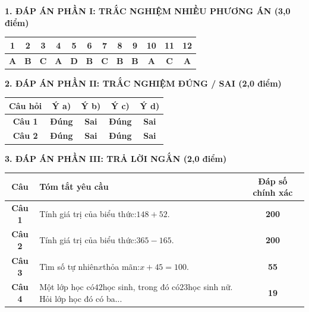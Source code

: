 \documentclass[11pt,a4paper]{article}
\begin{document}
\vspace{10pt}
\noindent\textbf{\large 1. ĐÁP ÁN PHẦN I: TRẮC NGHIỆM NHIỀU PHƯƠNG ÁN (3,0 điểm)}
\vspace{4pt}
\begin{center}
\begin{tabular}{|c|c|c|c|c|c|c|c|c|c|c|c|}
\hline
\textbf{1} & \textbf{2} & \textbf{3} & \textbf{4} & \textbf{5} & \textbf{6} & \textbf{7} & \textbf{8} & \textbf{9} & \textbf{10} & \textbf{11} & \textbf{12} \\
\hline
\textbf{A} & \textbf{B} & \textbf{C} & \textbf{A} & \textbf{D} & \textbf{B} & \textbf{C} & \textbf{B} & \textbf{B} & \textbf{A} & \textbf{C} & \textbf{A} \\
\hline
\end{tabular}
\end{center}
\vspace{6pt}


\noindent\textbf{\large 2. ĐÁP ÁN PHẦN II: TRẮC NGHIỆM ĐÚNG / SAI (2,0 điểm)}
\vspace{4pt}
\begin{center}
\begin{tabular}{|c|c|c|c|c|}
\hline
\textbf{Câu hỏi} & \textbf{Ý a)} & \textbf{Ý b)} & \textbf{Ý c)} & \textbf{Ý d)} \\
\hline
\textbf{Câu 1} & \textbf{Đúng} & \textbf{Sai} & \textbf{Đúng} & \textbf{Sai} \\
\hline
\textbf{Câu 2} & \textbf{Đúng} & \textbf{Sai} & \textbf{Đúng} & \textbf{Sai} \\
\hline
\end{tabular}
\end{center}
\vspace{6pt}


\noindent\textbf{\large 3. ĐÁP ÁN PHẦN III: TRẢ LỜI NGẮN (2,0 điểm)}
\vspace{4pt}
\begin{center}
\begin{tabular}{|c|m{11cm}|c|}
\hline
\textbf{Câu} & \textbf{Tóm tắt yêu cầu} & \textbf{Đáp số chính xác} \\
\hline
\textbf{Câu 1} & Tính giá trị của biểu thức:$148 + 52$. & \textbf{200} \\
\hline
\textbf{Câu 2} & Tính giá trị của biểu thức:$365 - 165$. & \textbf{200} \\
\hline
\textbf{Câu 3} & Tìm số tự nhiên$x$thỏa mãn:$x + 45 = 100$. & \textbf{55} \\
\hline
\textbf{Câu 4} & Một lớp học có$42$học sinh, trong đó có$23$học sinh nữ. Hỏi lớp học đó có ba... & \textbf{19} \\
\hline
\end{tabular}
\end{center}
\vspace{6pt}
\end{document}
